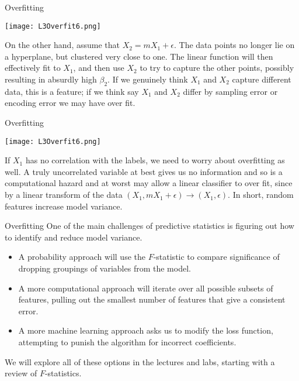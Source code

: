 \documentclass[10pt, table, dvipsnames,xcdraw, handout ]{beamer}
\begin{document}
\begin{frame}[fragile]{Overfitting}
  \begin{minipage}[t][0.5\textheight][t]{\textwidth}
	\centering {}
	\texttt{[image: L3Overfit6.png]} 
  \end{minipage}
  \vfill
\begin{minipage}[t][0.5\textheight][t]{\textwidth}
On the other hand, assume that $X_2 = mX_1 + \epsilon$. The data points no longer lie on a hyperplane, but clustered very close to one. The linear function will then effectively fit to $X_1$, and then use $X_2$ to try to capture the other points, possibly resulting in absurdly high $\beta_2$. If we genuinely think $X_1$ and $X_2$ capture different data, this is a feature; if we think say $X_1$ and $X_2$ differ by sampling error or encoding error we may have over fit.
\end{minipage}
\end{frame}





\begin{frame}[fragile]{Overfitting}
  \begin{minipage}[t][0.5\textheight][t]{\textwidth}
	\centering {}
	\texttt{[image: L3Overfit6.png]} 
  \end{minipage}
  \vfill
\begin{minipage}[t][0.5\textheight][t]{\textwidth}
If $X_1$ has no correlation with the labels, we need to worry about overfitting as well. A truly uncorrelated variable at best gives us no information and so is a computational hazard and at worst may allow a linear classifier to over fit, since by a linear transform of the data $(X_1, mX_1 + \epsilon) \to (X_1, \epsilon)$. In short, random features increase model variance. 
\end{minipage}
\end{frame}


\begin{frame}[fragile]{Overfitting}
One of the main challenges of predictive statistics is figuring out how to identify and reduce model variance. 

\begin{itemize}
\item[] A probability approach will use the $F$-statistic to compare significance of dropping groupings of variables from the model.\pause
\item[] A more computational approach will iterate over all possible subsets of features, pulling out the smallest number of features that give a consistent error. \pause
\item[] A more machine learning approach asks us to modify the loss function, attempting to punish the algorithm for incorrect coefficients.\pause
\end{itemize}
We will explore all of these options in the lectures and labs, starting with a review of $F$-statistics.
\end{frame}
\end{document}
